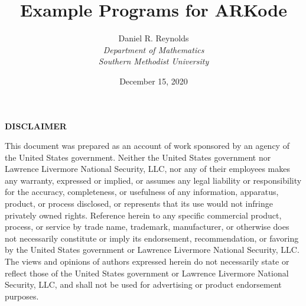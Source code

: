 \documentclass[letterpaper,10pt,english]{sphinxmanual}
\title{Example Programs for ARKode}
\date{December 15, 2020}
\author{
    Daniel R. Reynolds\\
    {\em Department of Mathematics} \\
    {\em Southern Methodist University}
    }
\newcommand{\sunreleasename}{v5.6.1}
\renewcommand{\releasename}{v4.6.1}
\begin{document}

\makeatletter



\makeatother

\clearpage

\thispagestyle{empty}%
\baselineskip
\begin{center}
  {\bf DISCLAIMER}
\end{center}
\noindent
This document was prepared as an account of work sponsored by an agency of
the United States government. Neither the United States government nor
Lawrence Livermore National Security, LLC, nor any of their employees makes
any warranty, expressed or implied, or assumes any legal liability or responsibility
for the accuracy, completeness, or usefulness of any information, apparatus, product,
or process disclosed, or represents that its use would not infringe privately owned rights.
Reference herein to any specific commercial product, process, or service by trade name,
trademark, manufacturer, or otherwise does not necessarily constitute or imply its endorsement,
recommendation, or favoring by the United States government or Lawrence Livermore National
Security, LLC. The views and opinions of authors expressed herein do not necessarily state
or reflect those of the United States government or Lawrence Livermore National Security, LLC,
and shall not be used for advertising or product endorsement purposes.
\end{document}
